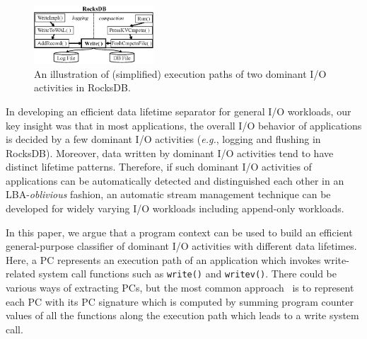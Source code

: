 \vspace{-10pt}
\section{}
\label{sec:programcontext}
\vspace{-5pt}
\begin{figure}[t]
	\centering
	\includegraphics[width=0.4\textwidth]{figure/writepath}
	\vspace{-5pt}
	\caption{An illustration of (simplified) execution paths of two dominant I/O activities in RocksDB.}
	\label{fig:iopath}
	\vspace{-10pt}
\end{figure}

In developing an efficient data lifetime separator for general I/O workloads,
our key insight was that in most applications, the overall I/O behavior of
applications is decided by a few dominant I/O activities ({\it e.g.}, logging and
flushing in RocksDB).  Moreover, data written by dominant I/O activities tend
to have distinct lifetime patterns.  Therefore, if such dominant I/O activities
of applications can be automatically detected and distinguished each other in
an LBA-{\it oblivious} fashion, an automatic stream management technique can be
developed for widely varying I/O workloads including append-only workloads.

In this paper, we argue that a program context can be used to build an
efficient general-purpose classifier of dominant I/O activities with different
data lifetimes.  Here, a PC represents an execution path of an application
which invokes write-related system call functions such as {\tt write()} and
{\tt writev()}.  There could be various ways of extracting PCs, but the most
common approach~\cite{PC, PC2} is to represent each PC with its PC signature
which is computed by summing program counter values of all the functions along
the execution path which leads to a write system call.

